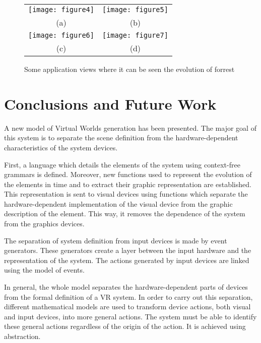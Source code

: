 \begin{figure}[htb]
    \begin{tabular}{cc}
        \texttt{[image: figure4]} &
        \texttt{[image: figure5]} \\
        \small{(a)} & \small{(b)} \\
        \texttt{[image: figure6]} &
        \texttt{[image: figure7]} \\
        \small{(c)} & \small{(d)} \\
    \end{tabular}
    \caption{\label{fig:programView}
    Some application views where it can be seen the evolution of forrest}
\end{figure}


\section{Conclusions and Future Work
\label{sec:conclusions}}

A new model of Virtual Worlds generation has been presented. The major goal of this system is to
separate the scene definition from the hardware-dependent characteristics of the system devices.

First, a language which details the elements of the system using context-free grammars is defined.
Moreover, new functions used to represent the evolution of the elements in time and to extract
their graphic representation are established. This representation is sent to visual devices using
functions which separate the  hardware-dependent implementation of the visual device from the
graphic description of the element. This way, it removes the dependence of the system from the
graphics devices.

The separation of system definition from input devices is made by event generators. These
generators create a layer between the input hardware and the representation of the system. The
actions generated by input devices are linked using the model of events.

In general, the whole model separates the hardware-dependent parts of devices from the formal
definition of a VR system. In order to carry out this separation, different mathematical models are
used to transform device actions, both visual and input devices, into more general actions. The
system must be able to identify these general actions regardless of the origin of the action. It is
achieved using abstraction.

